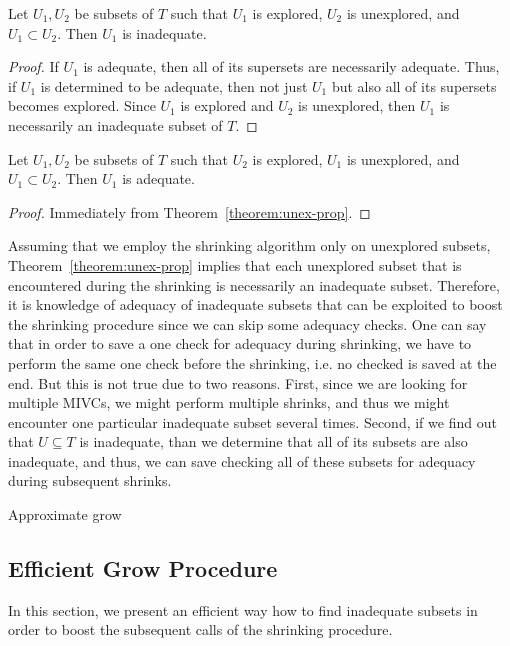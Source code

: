 \begin{theorem}
\label{theorem:unex-prop}
Let $U_1, U_2$ be subsets of $T$ such that $U_1$ is explored, $U_2$ is unexplored, and $U_1 \subset U_2$. Then $U_1$ is inadequate.
\end{theorem}

\begin{proof}
If $U_1$ is adequate, then all of its supersets are necessarily adequate. Thus, if $U_1$ is determined to be adequate, then not just $U_1$ but also all of its supersets becomes explored. Since $U_1$ is explored and $U_2$ is unexplored, then $U_1$ is necessarily an inadequate subset of $T$.
\end{proof}

\begin{corollary}
Let $U_1, U_2$ be subsets of $T$ such that $U_2$ is explored, $U_1$ is unexplored, and $U_1 \subset U_2$. Then $U_1$ is adequate.
\end{corollary}

\begin{proof}
Immediately from Theorem~\ref{theorem:unex-prop}. 
\end{proof}

Assuming that we employ the shrinking algorithm only on unexplored subsets, Theorem~\ref{theorem:unex-prop} implies that each unexplored subset that is encountered during the shrinking is necessarily an inadequate subset. Therefore, it is knowledge of adequacy of inadequate subsets that can be exploited to boost the shrinking procedure since we can skip some adequacy checks. One can say that in order to save a one check for adequacy during shrinking, we have to perform the same one check before the shrinking, i.e. no checked is saved at the end. But this is not true due to two reasons. First, since we are looking for multiple MIVCs, we might perform multiple shrinks, and thus we might encounter one particular inadequate subset several times. Second, if we find out that $U \subseteq T$ is inadequate, than we determine that all of its subsets are also inadequate, and thus, we can save checking all of these subsets for adequacy during subsequent shrinks. 

\begin{algorithm}[!t]

\caption{Approximate grow}
\end{algorithm}



\subsection{Efficient Grow Procedure}
In this section, we present an efficient way how to find inadequate subsets in order to boost the subsequent calls of the shrinking procedure.

